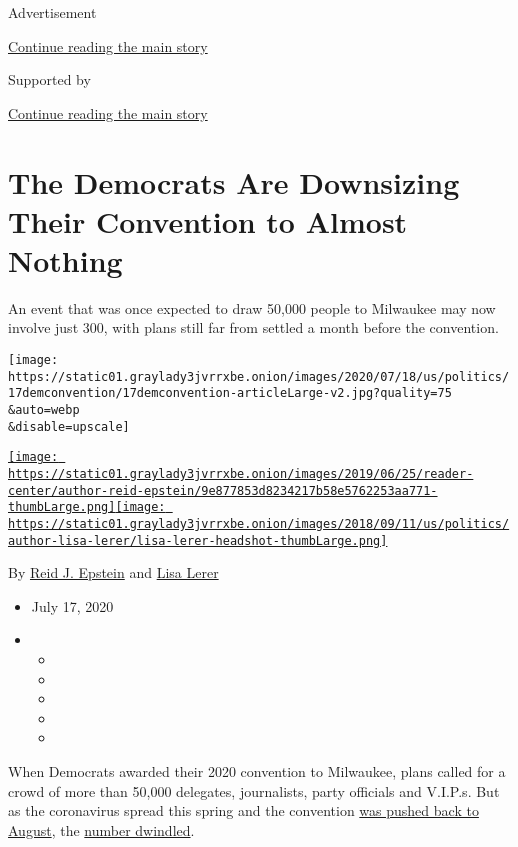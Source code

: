Advertisement

\protect\hyperlink{after-top}{Continue reading the main story}

Supported by

\protect\hyperlink{after-sponsor}{Continue reading the main story}

\hypertarget{the-democrats-are-downsizing-their-convention-to-almost-nothing}{%
\section{The Democrats Are Downsizing Their Convention to Almost
Nothing}\label{the-democrats-are-downsizing-their-convention-to-almost-nothing}}

An event that was once expected to draw 50,000 people to Milwaukee may
now involve just 300, with plans still far from settled a month before
the convention.

\texttt{[image: https://static01.graylady3jvrrxbe.onion/images/2020/07/18/us/politics/17demconvention/17demconvention-articleLarge-v2.jpg?quality=75\\\&auto=webp\\\&disable=upscale]}

\href{https://www.nytimes3xbfgragh.onion/by/reid-j-epstein}{\texttt{[image: https://static01.graylady3jvrrxbe.onion/images/2019/06/25/reader-center/author-reid-epstein/9e877853d8234217b58e5762253aa771-thumbLarge.png]}}\href{https://www.nytimes3xbfgragh.onion/by/lisa-lerer}{\texttt{[image: https://static01.graylady3jvrrxbe.onion/images/2018/09/11/us/politics/author-lisa-lerer/lisa-lerer-headshot-thumbLarge.png]}}

By \href{https://www.nytimes3xbfgragh.onion/by/reid-j-epstein}{Reid J.
Epstein} and
\href{https://www.nytimes3xbfgragh.onion/by/lisa-lerer}{Lisa Lerer}

\begin{itemize}
\item
  July 17, 2020
\item
  \begin{itemize}
  \item
  \item
  \item
  \item
  \item
  \end{itemize}
\end{itemize}

When Democrats awarded their 2020 convention to Milwaukee, plans called
for a crowd of more than 50,000 delegates, journalists, party officials
and V.I.P.s. But as the coronavirus spread this spring and the
convention
\href{https://www.nytimes3xbfgragh.onion/2020/04/02/us/politics/milwaukee-democratic-convention-delayed.html}{was
pushed back to August}, the
\href{https://www.nytimes3xbfgragh.onion/2020/06/24/us/politics/democratic-convention-milwaukee-coronavirus.html}{number
dwindled}.

